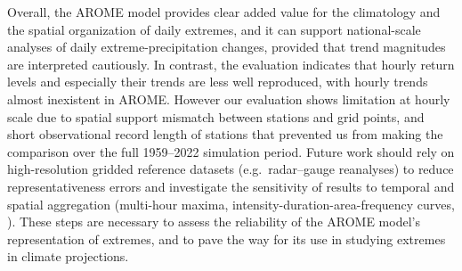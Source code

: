 \documentclass[french,a4paper,DIV=11,numbers=noendperiod]{scrartcl}
\begin{document}


Overall, the AROME model provides clear added value for the climatology and the spatial organization of daily extremes, and it can support national-scale analyses of daily extreme-precipitation changes, provided that trend magnitudes are interpreted cautiously. In contrast, the evaluation indicates that hourly return levels and especially their trends are less well reproduced, with hourly trends almost inexistent in AROME. However our evaluation shows limitation at hourly scale due to spatial support mismatch between stations and grid points, and short observational record length of stations that prevented us from making the comparison over the full 1959--2022 simulation period. Future work should rely on high-resolution gridded reference datasets (e.g.\ radar--gauge reanalyses) to reduce representativeness errors and investigate the sensitivity of results to temporal and spatial aggregation (multi-hour maxima, intensity-duration-area-frequency curves, \cite{haruna-etal-2024}). These steps are necessary to assess the reliability of the AROME model's representation of extremes, and to pave the way for its use in studying extremes in climate projections.
\end{document}

